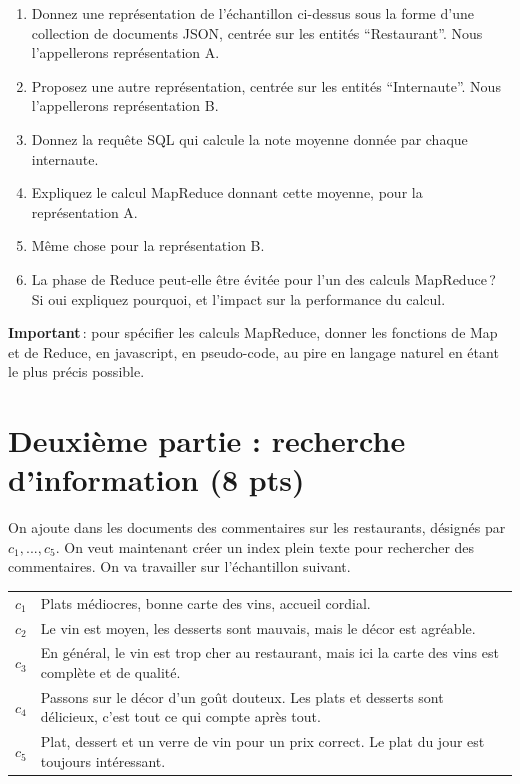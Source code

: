 \documentclass[11pt,a4paper]{article}
\begin{document}
\begin{enumerate}
  \item Donnez une représentation de l'échantillon ci-dessus sous la forme d'une collection
      de documents JSON, centrée sur les entités ``Restaurant''. 
      Nous l'appellerons représentation A.
  \item Proposez une autre représentation, centrée sur les entités ``Internaute''.  Nous l'appellerons représentation B.
             \item Donnez la requête SQL qui calcule la note moyenne donnée par chaque internaute.
           \item Expliquez le calcul MapReduce donnant cette moyenne, pour la représentation A.
           \item Même chose pour la représentation B.
           \item La phase de Reduce peut-elle être évitée pour l'un des calculs MapReduce\,?
                Si oui expliquez pourquoi, et l'impact sur la performance du calcul. 
\end{enumerate}

\textbf{Important}\,: pour spécifier les calculs MapReduce, donner les fonctions de Map et de Reduce, en javascript,
en pseudo-code, au pire en langage naturel en étant le plus précis possible.


\section*{Deuxième partie : recherche d'information (8 pts)}

On ajoute dans les  documents des commentaires sur les restaurants, désignés
par $c_1, ..., c_5$. On veut maintenant
créer un index plein texte pour rechercher des commentaires. On va travailler sur l'échantillon
suivant.

\vspace*{0.3cm}

\begin{tabular}{lp{15cm}}
     $c_1$& Plats médiocres, bonne carte des vins, accueil cordial.\\
     $c_2$& Le vin est moyen, les desserts sont mauvais, mais le décor est agréable.\\
     $c_3$& En général, le vin est trop cher au restaurant, mais ici la carte
         des vins est complète et de qualité.\\
     $c_4$& Passons sur le décor d'un goût douteux. Les plats et desserts sont délicieux,
          c'est tout ce qui compte après tout.\\
     $c_5$& Plat, dessert et un verre de vin pour un prix correct. Le plat du jour
             est toujours intéressant.\\ 
\end{tabular}
\end{document}
